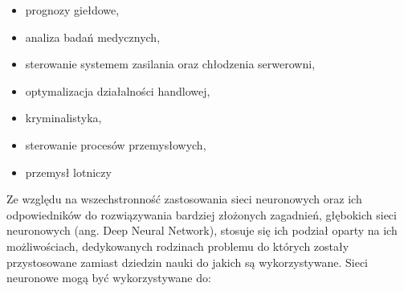 \begin{itemize}
	\item prognozy giełdowe,
	\item analiza badań medycznych,
	\item sterowanie systemem zasilania oraz chłodzenia serwerowni,
	\item optymalizacja działalności handlowej,
	\item kryminalistyka,
	\item sterowanie procesów przemysłowych,
	\item przemysł lotniczy
\end{itemize}

Ze względu na wszechstronność zastosowania sieci neuronowych oraz ich odpowiedników do rozwiązywania bardziej złożonych zagadnień, głębokich sieci neuronowych (ang. Deep Neural Network), stosuje się ich podział oparty na ich możliwościach, dedykowanych rodzinach problemu do których zostały przystosowane zamiast dziedzin nauki do jakich są wykorzystywane.
Sieci neuronowe mogą być wykorzystywane do:

